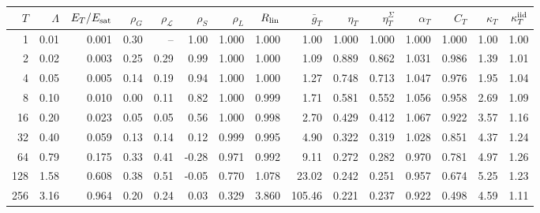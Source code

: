 \begin{tabular}{rrrrrrrrrrrrrrr}
\toprule
$T$ & $\Lambda$ & $E_T/E_{\rm sat}$ & $\rho_G$ & $\rho_{\mathcal L}$ & $\rho_S$ & $\rho_L$ & $R_{\rm lin}$ & $\bar g_T$ & $\eta_T$ & $\eta^\Sigma_T$ & $\alpha_T$ & $C_T$ & $\kappa_T$ & $\kappa^{\rm iid}_T$\\
\midrule
1 & 0.01 & 0.001 & 0.30 & -- & 1.00 & 1.000 & 1.000 & 1.00 & 1.000 & 1.000 & 1.000 & 1.000 & 1.00 & 1.00\\
2 & 0.02 & 0.003 & 0.25 & 0.29 & 0.99 & 1.000 & 1.000 & 1.09 & 0.889 & 0.862 & 1.031 & 0.986 & 1.39 & 1.01\\
4 & 0.05 & 0.005 & 0.14 & 0.19 & 0.94 & 1.000 & 1.000 & 1.27 & 0.748 & 0.713 & 1.047 & 0.976 & 1.95 & 1.04\\
8 & 0.10 & 0.010 & 0.00 & 0.11 & 0.82 & 1.000 & 0.999 & 1.71 & 0.581 & 0.552 & 1.056 & 0.958 & 2.69 & 1.09\\
16 & 0.20 & 0.023 & 0.05 & 0.05 & 0.56 & 1.000 & 0.998 & 2.70 & 0.429 & 0.412 & 1.067 & 0.922 & 3.57 & 1.16\\
32 & 0.40 & 0.059 & 0.13 & 0.14 & 0.12 & 0.999 & 0.995 & 4.90 & 0.322 & 0.319 & 1.028 & 0.851 & 4.37 & 1.24\\
64 & 0.79 & 0.175 & 0.33 & 0.41 & -0.28 & 0.971 & 0.992 & 9.11 & 0.272 & 0.282 & 0.970 & 0.781 & 4.97 & 1.26\\
128 & 1.58 & 0.608 & 0.38 & 0.51 & -0.05 & 0.770 & 1.078 & 23.02 & 0.242 & 0.251 & 0.957 & 0.674 & 5.25 & 1.23\\
256 & 3.16 & 0.964 & 0.20 & 0.24 & 0.03 & 0.329 & 3.860 & 105.46 & 0.221 & 0.237 & 0.922 & 0.498 & 4.59 & 1.11\\
\bottomrule
\end{tabular}
